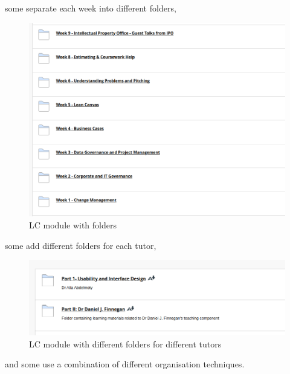 some separate each week into different folders, 

\begin{figure}[H]
    \centering
    \includegraphics[scale=0.25]{images/LC screenshots/LC module with folders.png}
    \caption{LC module with folders}
    \label{fig:my_label}
\end{figure}

some add different folders for each tutor, 

\begin{figure}[H]
    \centering
    \includegraphics[scale=0.25]{images/LC screenshots/LC module with folders diff tutors.png}
    \caption{LC module with different folders for different tutors}
    \label{fig:my_label}
\end{figure}

and some use a combination of different organisation techniques.

